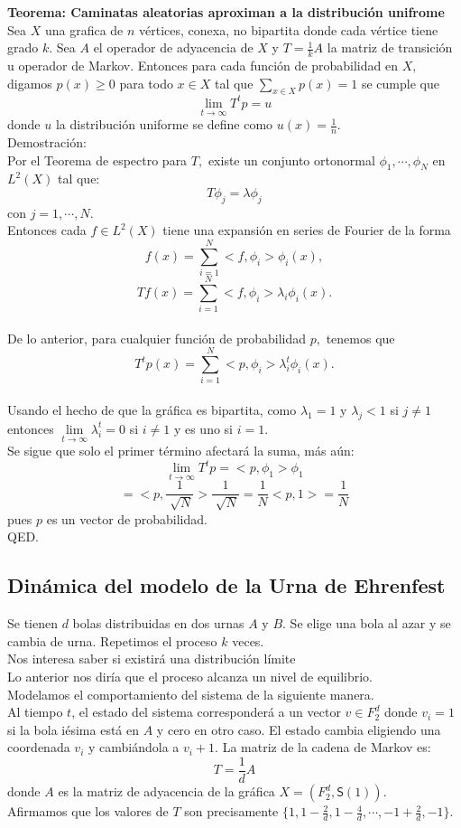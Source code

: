 \documentclass[a4paper,openright,10pt]{article}
\begin{document}
\textbf{Teorema: Caminatas aleatorias aproximan a la distribuci\'on unifrome} \\
Sea $X$ una grafica de $n$ v\'ertices, conexa, no bipartita donde cada v\'ertice tiene grado $k.$ Sea $A$ el operador de adyacencia de $X$ y $T=\frac{1}{k}A$ la matriz de transici\'on u operador de Markov. Entonces para cada funci\'on de probabilidad en $X,$ digamos $p(x)\geq 0$ para todo $x\in X$ tal que $\sum\limits_{x\in X}p(x)=1$ se cumple que $$ \lim_{t\rightarrow \infty} T^{t}p=u$$ donde $u$ la distribuci\'on uniforme se define como $u(x)=\frac{1}{n}.$\\
Demostraci\'on:\\ 
Por el Teorema de espectro para $T,$ existe un conjunto ortonormal $\phi_{1},\cdots,\phi_{N}$ en $L^{2}(X)$ tal que:
$$
T\phi_{j}=\lambda \phi_{j}
$$ con $j=1,\cdots,N.$\\
Entonces cada $f\in L^{2}(X)$ tiene una expansi\'on en series de Fourier de la forma 
$$
f(x)=\sum\limits_{i=1}^{N} <f,\phi_{i}>\phi_{i}(x),
$$ $$
Tf(x)=\sum\limits_{i=1}^{N}<f,\phi_{i}>\lambda_{i}\phi_{i}(x).
$$\\
De lo anterior, para cualquier funci\'on de probabilidad $p,$ tenemos que $$
T^{t}p(x)=\sum\limits_{i=1}^{N}<p,\phi_{i}>\lambda_{i}^{t}\phi_{i}(x).
$$\\
Usando el hecho de que la gr\'afica es bipartita, como $\lambda_{1}=1$ y $\lambda_{j}<1$ si $j\neq 1$ entonces $\lim\limits_{t\rightarrow \infty} \lambda_{i}^{t}=0$ si $i\neq 1$ y es uno si $i=1.$\\
Se sigue que solo el primer t\'ermino afectar\'a la suma, m\'as a\'un: $$
\lim\limits_{t\rightarrow \infty} T^{t}p=<p,\phi_{1}>\phi_{1}
$$ $$
=<p,\frac{1}{\sqrt[]{N}}>\frac{1}{\sqrt[]{N}}=\frac{1}{N}<p,1>=\frac{1}{N}
$$ pues $p$ es un vector de probabilidad.\\ 
QED.
\subsection{Din\'amica del modelo de la Urna de Ehrenfest}
Se tienen $d$ bolas distribuidas en dos urnas $A$ y $B.$ Se elige una bola al azar y se cambia de urna. Repetimos el proceso $k$ veces.\\
Nos interesa saber si existir\'a una distribuci\'on l\'imite\\ Lo anterior nos dir\'ia que el proceso alcanza un nivel de equilibrio.\\
Modelamos el comportamiento del sistema de la siguiente manera.\\
Al tiempo $t$, el estado del sistema corresponder\'a a un vector $v \in\textit{F}_{2} ^{d}$ donde $v_{i}=1$ si la bola i\'esima est\'a en $A$ y cero en otro caso.
El estado cambia eligiendo una coordenada $v_{i}$ y cambi\'andola a $v_{i}+1.$ La matriz de la cadena de Markov es: $$ T=\frac{1}{d}A
$$ donde $A$ es la matriz de adyacencia de la gr\'afica $X=(\textit{F}_{2} ^{d}, \textsf{S}(1)).$\\
Afirmamos que los valores de $T$ son precisamente $\{1,1-\frac{2}{d},1-\frac{4}{d},\cdots, -1+\frac{2}{d},-1\}.$\\
\end{document}
